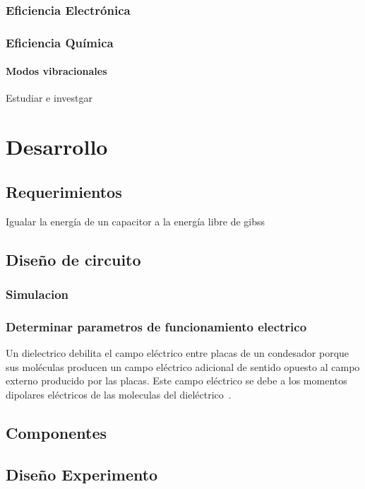 \documentclass[12pt,twoside,onecolumn]{article}
\begin{document}
\subsubsection{Eficiencia Electrónica}
\subsubsection{Eficiencia Química}

\paragraph{Modos vibracionales}
Estudiar e investgar

\section{Desarrollo}

\subsection{Requerimientos}

Igualar la energía de un capacitor a la energía libre de gibss

\subsection{Diseño de circuito}

\subsubsection{Simulacion}


\subsubsection{Determinar parametros de funcionamiento electrico}
Un dielectrico debilita el campo eléctrico entre placas de un condesador porque sus moléculas producen un campo eléctrico adicional de sentido opuesto al campo externo producido por las placas. Este campo eléctrico se debe a los momentos dipolares eléctricos de las moleculas del dieléctrico~\cite{tipler2005fisica}.

\subsection{Componentes}

\subsection{Diseño Experimento}
\end{document}
